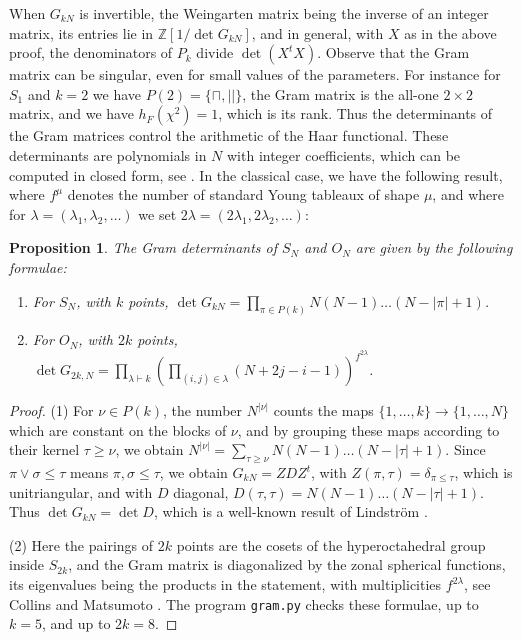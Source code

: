 \documentclass[11pt]{amsart}
\newtheorem{proposition}[theorem]{Proposition}
\theoremstyle{definition}
\begin{document}
When $G_{kN}$ is invertible, the Weingarten matrix being the inverse of an integer matrix, its entries lie in $\mathbb Z[1/\det G_{kN}]$, and in general, with $X$ as in the above proof, the denominators of $P_k$ divide $\det(X^tX)$. Observe that the Gram matrix can be singular, even for small values of the parameters. For instance for $S_1$ and $k=2$ we have $P(2)=\{\sqcap,||\}$, the Gram matrix is the all-one $2\times2$ matrix, and we have $h_F(\chi^2)=1$, which is its rank. Thus the determinants of the Gram matrices control the arithmetic of the Haar functional. These determinants are polynomials in $N$ with integer coefficients, which can be computed in closed form, see \cite{bcu}. In the classical case, we have the following result, where $f^\mu$ denotes the number of standard Young tableaux of shape $\mu$, and where for $\lambda=(\lambda_1,\lambda_2,\ldots)$ we set $2\lambda=(2\lambda_1,2\lambda_2,\ldots)$:

\begin{proposition}
\label{p24}
The Gram determinants of $S_N$ and $O_N$ are given by the following formulae:
\begin{enumerate}
\item For $S_N$, with $k$ points, $\det G_{kN}=\prod_{\pi\in P(k)}N(N-1)\ldots(N-|\pi|+1)$.

\item For $O_N$, with $2k$ points, $\det G_{2k,N}=\prod_{\lambda\vdash k}\left(\prod_{(i,j)\in\lambda}(N+2j-i-1)\right)^{f^{2\lambda}}$.
\end{enumerate}
\end{proposition}

\begin{proof}
(1) For $\nu\in P(k)$, the number $N^{|\nu|}$ counts the maps $\{1,\ldots,k\}\to\{1,\ldots,N\}$ which are constant on the blocks of $\nu$, and by grouping these maps according to their kernel $\tau\geq\nu$, we obtain $N^{|\nu|}=\sum_{\tau\geq\nu}N(N-1)\ldots(N-|\tau|+1)$. Since $\pi\vee\sigma\leq\tau$ means $\pi,\sigma\leq\tau$, we obtain $G_{kN}=ZDZ^t$, with $Z(\pi,\tau)=\delta_{\pi\leq\tau}$, which is unitriangular, and with $D$ diagonal, $D(\tau,\tau)=N(N-1)\ldots(N-|\tau|+1)$. Thus $\det G_{kN}=\det D$, which is a well-known result of Lindstr\"om \cite{lin}.

(2) Here the pairings of $2k$ points are the cosets of the hyperoctahedral group inside $S_{2k}$, and the Gram matrix is diagonalized by the zonal spherical functions, its eigenvalues being the products in the statement, with multiplicities $f^{2\lambda}$, see Collins and Matsumoto \cite{cmt}. The program {\tt gram.py} checks these formulae, up to $k=5$, and up to $2k=8$.
\end{proof}
\end{document}
